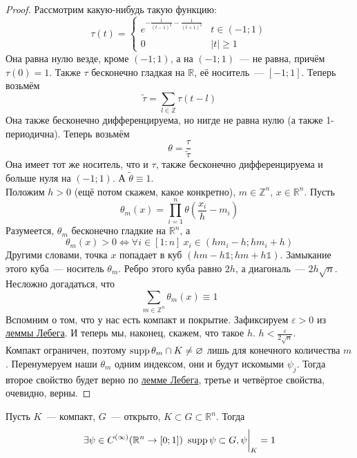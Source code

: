 \documentclass{article}
\let\eps\varepsilon
\begin{document}
    \begin{proof}
        Рассмотрим какую-нибудь такую функцию:
        $$
        \tau(t)=\begin{cases}
            e^{-\frac1{(t-1)^2}-\frac1{(t+1)^2}} & t\in(-1;1)\\
            0 & |t|\geqslant1
        \end{cases}
        $$
        Она равна нулю везде, кроме $(-1;1)$, а на $(-1;1)$~--- не равна, причём $\tau(0)=1$. Также $\tau$ бесконечно гладкая на $\mathbb R$, её носитель~--- $[-1;1]$. Теперь возьмём
        $$
        \widetilde\tau=\sum\limits_{l\in\mathbb Z}\tau(t-l)
        $$
        Она также бесконечно дифференцируема, но нигде не равна нулю (а также 1-периодична). Теперь возьмём
        $$
        \theta=\frac\tau{\widetilde\tau}
        $$
        Она имеет тот же носитель, что и $\tau$, также бесконечно дифференцируема и больше нуля на $(-1;1)$. А $\widetilde\theta\equiv1$.\\
        Положим $h>0$ (ещё потом скажем, какое конкретно), $m\in\mathbb Z^n$, $x\in\mathbb R^n$. Пусть
        $$
        \theta_m(x)=\prod\limits_{i=1}^n\theta\left(\frac{x_i}h-m_i\right)
        $$
        Разумеется, $\theta_m$ бесконечно гладкие на $\mathbb R^n$, а
        $$\theta_m(x)>0\Leftrightarrow\forall i\in[1:n]~x_i\in(hm_i-h;hm_i+h)$$
        Другими словами, точка $x$ попадает в куб $(hm-h\mathbb1;hm+h\mathbb1)$. Замыкание этого куба~--- носитель $\theta_m$. Ребро этого куба равно $2h$, а диагональ~--- $2h\sqrt n$. Несложно догадаться, что
        $$
        \sum\limits_{m\in\mathbb Z^n}\theta_m(x)\equiv1
        $$
        Вспомним о том, что у нас есть компакт и покрытие. Зафиксируем $\eps>0$ из \hyperref[Лемма Лебега о компакте]{леммы Лебега}. И теперь мы, наконец, скажем, что такое $h$. $h<\frac\eps{2\sqrt n}$.\\
        Компакт ограничен, поэтому $\operatorname{supp}\theta_m\cap K\neq\varnothing$ лишь для конечного количества $m$. Перенумеруем наши $\theta_m$ одним индексом, они и будут искомыми $\psi_j$. Тогда второе свойство будет верно по \hyperref[Лемма Лебега о компакте]{лемме Лебега}, третье и четвёртое свойства, очевидно, верны.
    \end{proof}
    \begin{corollary}
        \label{Следствие о гладком спуске}
        Пусть $K$~--- компакт, $G$~--- открыто, $K\subset G\subset\mathbb R^n$. Тогда
        $$
        \exists\psi\in C^{(\infty)}(\mathbb R^n\to[0;1])~\operatorname{supp}\psi\subset G,\psi\bigg|_K=1
        $$
    \end{corollary}
\end{document}
